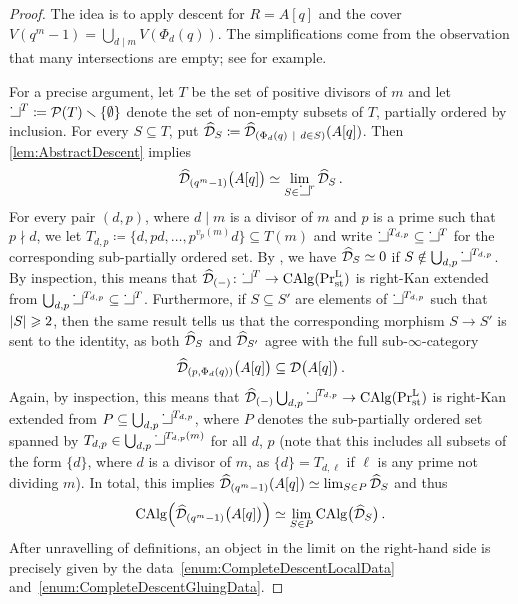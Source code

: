 \documentclass[DIV=12,numbers=enddot,leqno,bibliography=totoc]{scrartcl}
\begin{document}
	\begin{proof}
		The idea is to apply descent for $R=A[q]$ and the cover $V(q^m-1)=\bigcup_{d\mid m}V(\Phi_d(q))$. The simplifications come from the observation that many intersections are empty; see \cite[Lemma~]{qWitt} for example.
		
		For a precise argument, let $T$ be the set of positive divisors of $m$ and let $\pullbacksign^{T}\coloneqq \Pp(T)\smallsetminus\{\emptyset\}$ denote the set of non-empty subsets of $T$, partially ordered by inclusion. For every $S\subseteq T$, put $\widehat{\Dd}_S\coloneqq \widehat{\Dd}_{\left(\Phi_d(q)\ \middle|\ d\in S\right)}(A[q])$. Then \cref{lem:AbstractDescent} implies
		\begin{equation*}
			\widehat{\Dd}_{(q^m-1)}\bigl(A[q]\bigr)\simeq \limit_{S\in\pullbacksign^r}\widehat{\Dd}_S\,.
		\end{equation*}
		For every pair $(d,p)$, where $d\mid m$ is a divisor of $m$ and $p$ is a prime such that $p\nmid d$, we let $T_{d,p}\coloneqq \{d,pd,\dotsc,p^{v_p(m)}d\}\subseteq T(m)$ and write $\pullbacksign^{T_{d,p}}\subseteq \pullbacksign^{T}$ for the corresponding sub-partially ordered set. By \cite[Lemma~]{qWitt}, we have $\widehat{\mathcal{D}}_S\simeq 0$ if $S\notin \bigcup_{d,p}\pullbacksign^{T_{d,p}}$. By inspection, this means that $\widehat{\Dd}_{(-)}\colon \pullbacksign^{T}\rightarrow \CAlg(\Pr_\mathrm{st}^\L)$ is right-Kan extended from $\bigcup_{d,p}\pullbacksign^{T_{d,p}}\subseteq \pullbacksign^{T}$. Furthermore, if $S\subseteq S'$ are elements of $\pullbacksign^{T_{d,p}}$ such that $\lvert S\rvert\geqslant 2$, then the same result tells us that the corresponding morphism $S\rightarrow S'$ is sent to the identity, as both $\widehat{\mathcal{D}}_S$ and $\widehat{\mathcal{D}}_{S'}$ agree with the full sub-$\infty$-category 
		\begin{equation*}
			\widehat{\mathcal{D}}_{(p,\Phi_d(q))}\big(A[q]\big)\subseteq \mathcal{D}\bigl(A[q]\bigr)\,.
		\end{equation*}
		Again, by inspection, this means that $\widehat{\Dd}_{(-)}\bigcup_{d,p}\pullbacksign^{T_{d,p}}\rightarrow \CAlg(\Pr_\mathrm{st}^\L)$ is right-Kan extended from $P\subseteq \bigcup_{d,p}\pullbacksign^{T_{d,p}}$, where $P$ denotes the sub-partially ordered set spanned by $T_{d,p}\in \bigcup_{d,p}\pullbacksign^{T_{d,p}(m)}$ for all $d$, $p$ (note that this includes all subsets of the form $\{d\}$, where $d$ is a divisor of $m$, as $\{d\}=T_{d,\ell}$ if $\ell$ is any prime not dividing $m$). In total, this implies $\widehat{\Dd}_{(q^m-1)}\left(A[q]\right)\simeq \limit_{S\in P}\widehat{\Dd}_S$ and thus
		\begin{equation*}
			\CAlg\left(\widehat{\Dd}_{(q^m-1)}\bigl(A[q]\bigr)\right)\simeq \limit_{S\in P}\CAlg\bigl(\widehat{\Dd}_S\bigr)\,.
		\end{equation*}
		After unravelling of definitions, an object in the limit on the right-hand side is precisely given by the data~\cref{enum:CompleteDescentLocalData} and~\cref{enum:CompleteDescentGluingData}.
	\end{proof}
\end{document}
